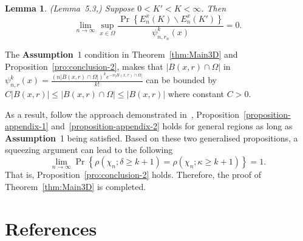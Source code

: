 \documentclass[preprint,12pt]{elsarticle}
\newtheorem{lemma}{Lemma}
\begin{document}
\begin{lemma} (Lemma~5.3,\cite{Penrose-k-connectivity}) Suppose $0<K'<K<\infty$. Then
   $$
        \lim_{n\rightarrow\infty}\mathop{\sup}_{x\in \Omega}
        \frac{\Pr\left\{E_n^x(K)\backslash E_n^x(K')\right\}}{\psi_{n,r_n}^k(x)}=0.
   $$
\end{lemma}



 The \textbf{Assumption}~1 condition in Theorem~\ref{thm:Main3D} and Proposition~\ref{pro:conclusion-2}, makes that
   $|B(x,r)\cap\Omega|$ in  $
       \psi^k_{n,r}(x)= \frac{\left(n|B(x,r)\cap\Omega|\right)^k
       e^{-n|B(x,r)\cap\Omega|}}{k!}
$
can be bounded by $C|B(x,r)|\leq|B(x,r)\cap\Omega|\leq |B(x,r)|$ where constant $C>0$.


As a result, follow the   approach demonstrated in~\cite{Penrose-k-connectivity,Ding-RGG2018, Ding-RGG2025, Ding2022-3DRadii},  Proposition~\ref{proposition-appendix-1} and~\ref{proposition-appendix-2} holds for general  regions as long as \textbf{Assumption}~1 being satisfied.
Based on these two generalised propositions, a squeezing argument can lead to the following
$$\lim_{n\rightarrow\infty}\Pr\left\{\rho(\chi_n;\delta\geq k+1)=\rho(\chi_n;\kappa\geq
k+1)\right\}=1.$$
That is,  Proposition~\ref{pro:conclusion-2} holds.
Therefore,  the proof of Theorem~\ref{thm:Main3D} is completed.




\section*{References}

%


\end{document}
